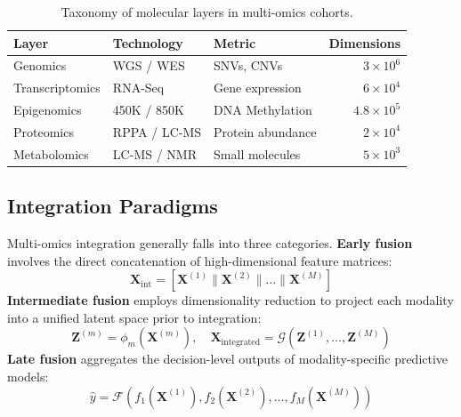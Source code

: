 \documentclass[sigconf,nonacm]{acmart}
\begin{document}
\begin{table}[h]
\caption{Taxonomy of molecular layers in multi-omics cohorts.}\label{tab:taxonomy}
\centering
\small
\renewcommand{\arraystretch}{1.3}
\begin{tabularx}{\columnwidth}{l l l r}
\toprule
\rowcolor{headergray} \textbf{Layer} & \textbf{Technology} & \textbf{Metric} & \textbf{Dimensions} \\
\midrule
Genomics        & WGS / WES     & SNVs, CNVs        & $3 \times 10^6$ \\
\rowcolor{rowgray} Transcriptomics & RNA-Seq       & Gene expression   & $6 \times 10^4$ \\
Epigenomics     & 450K / 850K   & DNA Methylation   & $4.8 \times 10^5$ \\
\rowcolor{rowgray} Proteomics      & RPPA / LC-MS  & Protein abundance & $2 \times 10^4$ \\
Metabolomics    & LC-MS / NMR   & Small molecules   & $5 \times 10^3$ \\
\bottomrule
\end{tabularx}
\end{table}

\subsection{Integration Paradigms}
Multi-omics integration generally falls into three categories.
\textbf{Early fusion} involves the direct concatenation of high-dimensional feature matrices:
\begin{equation}
\mathbf{X}_{\text{int}} = \left[ \mathbf{X}^{(1)} \parallel \mathbf{X}^{(2)} \parallel \dots \parallel \mathbf{X}^{(M)} \right]
\end{equation}
\textbf{Intermediate fusion} employs dimensionality reduction to project each modality into a unified latent space prior to integration:
\begin{equation}
\mathbf{Z}^{(m)} = \phi_m\left(\mathbf{X}^{(m)}\right), \quad \mathbf{X}_{\text{integrated}} = \mathcal{G}\left(\mathbf{Z}^{(1)}, \dots, \mathbf{Z}^{(M)}\right)
\end{equation}
\textbf{Late fusion} aggregates the decision-level outputs of modality-specific predictive models:
\begin{equation}
\hat{y} = \mathcal{F}\left( f_1(\mathbf{X}^{(1)}), f_2(\mathbf{X}^{(2)}), \dots, f_M(\mathbf{X}^{(M)}) \right)
\end{equation}
\end{document}
